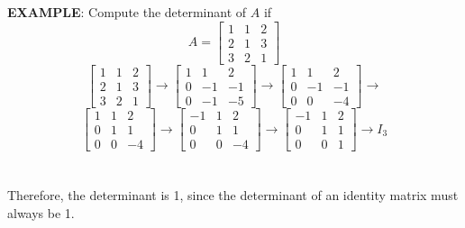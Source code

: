 \documentclass[letterpaper]{report}
\begin{document}
\\ \\ 
\textbf{EXAMPLE}: Compute the determinant of $A$ if 
\[
A = 
\begin{bmatrix} 
    1 & 1 & 2 \\
    2 & 1 &3 \\
    3 & 2 & 1
\end{bmatrix} 
\] 
\[
\begin{bmatrix} 
    1 & 1  &2 \\
    2 & 1 & 3 \\
    3 & 2 & 1 
\end{bmatrix} \to 
\begin{bmatrix} 
    1 & 1 & 2 \\
    0 & -1 & -1 \\
    0 & -1 & -5 
\end{bmatrix} \to 
\begin{bmatrix} 
    1 & 1 & 2 \\
    0 & -1 & -1 \\
    0 & 0 & -4
\end{bmatrix} \to
\] 
\[
\begin{bmatrix} 
    1 & 1 & 2 \\
    0 & 1 & 1 \\
    0 & 0 & -4
\end{bmatrix} \to 
\begin{bmatrix} 
    -1 & 1 & 2 \\
    0 & 1 & 1 \\
    0 & 0 & -4
\end{bmatrix} \to 
\begin{bmatrix} 
    -1 & 1 & 2 \\
    0 & 1 & 1 \\
    0 & 0 & 1
\end{bmatrix} \to 
I_3
\] \\ \\ 
Therefore, the determinant is 1, since the determinant of an identity matrix must always be 1. 
\end{document}
